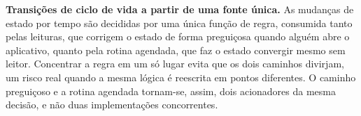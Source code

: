     \textbf{Transições de ciclo de vida a partir de uma fonte única.} As mudanças de estado por tempo são decididas por uma única função de regra, consumida tanto pelas leituras, que corrigem o estado de forma preguiçosa quando alguém abre o aplicativo, quanto pela rotina agendada, que faz o estado convergir mesmo sem leitor. Concentrar a regra em um só lugar evita que os dois caminhos divirjam, um risco real quando a mesma lógica é reescrita em pontos diferentes. O caminho preguiçoso e a rotina agendada tornam-se, assim, dois acionadores da mesma decisão, e não duas implementações concorrentes.
